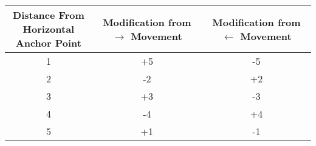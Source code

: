 \documentclass[margin=.2cm]{standalone}
\begin{document}
\begin{tabular}{||c|c|c||} 
 \hline
 \thead{Distance From \\ Horizontal Anchor Point} & \thead{Modification from \\$\rightarrow$ Movement} & \thead{Modification from \\$\leftarrow$ Movement} \\ [0.5ex] 
 \hline\hline
 1 & +5 & -5 \\ 
 \hline
 2 & -2 & +2 \\
 \hline
 3 & +3 & -3 \\
 \hline
 4 & -4 & +4 \\
 \hline
 5 & +1 & -1 \\ 
 \hline
\end{tabular}
\end{document}

